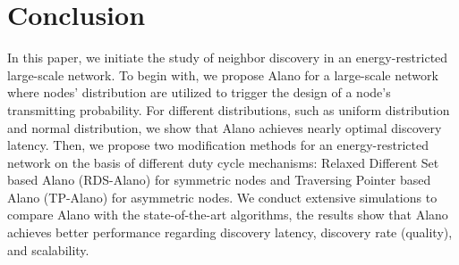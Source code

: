 \section{Conclusion}
\label{Conclusion}
In this paper, we initiate the study of neighbor discovery in an energy-restricted large-scale network.
To begin with, we propose Alano for a large-scale network where nodes' distribution are utilized to trigger the design of a node's transmitting probability. For different distributions, such as uniform distribution and normal distribution, we show that Alano achieves nearly optimal discovery latency. Then, we propose two modification methods for an energy-restricted network on the basis of different duty cycle mechanisms: Relaxed Different Set based Alano (RDS-Alano) for symmetric nodes and Traversing Pointer based Alano (TP-Alano) for asymmetric nodes. We conduct extensive simulations to compare Alano with the state-of-the-art algorithms, the results show that Alano achieves better performance regarding discovery latency, discovery rate (quality), and scalability.%
